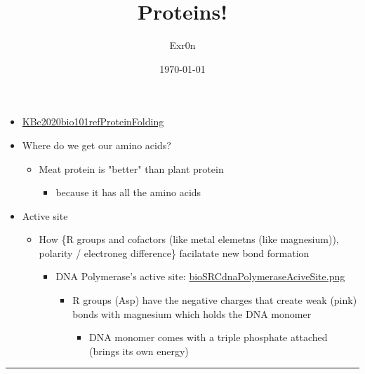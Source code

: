 \documentclass[letterpaper]{article}
\author{Exr0n}
\date{\today}
\title{Proteins!}
\renewcommand\maketitle{}
\begin{document}
\maketitle
\begin{itemize}
\item \href{KBe2020bio101refProteinFolding.org}{KBe2020bio101refProteinFolding}
\item Where do we get our amino acids?

\begin{itemize}
\item Meat protein is "better" than plant protein

\begin{itemize}
\item because it has all the amino acids
\end{itemize}
\end{itemize}

\item Active site

\begin{itemize}
\item How \{R groups and cofactors (like metal elemetns (like magnesium)),
polarity / electroneg difference\} facilatate new bond formation

\begin{itemize}
\item DNA Polymerase's active site:
\href{bioSRCdnaPolymeraseAciveSite.png.org}{bioSRCdnaPolymeraseAciveSite.png}

\begin{itemize}
\item R groups (Asp) have the negative charges that create weak (pink)
bonds with magnesium which holds the DNA monomer

\begin{itemize}
\item DNA monomer comes with a triple phosphate attached (brings its
own energy)
\end{itemize}
\end{itemize}
\end{itemize}
\end{itemize}
\end{itemize}

\noindent\rule{\textwidth}{0.5pt}
\end{document}

